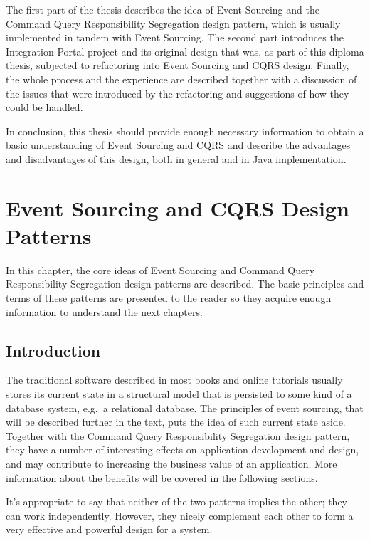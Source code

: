 \documentclass{book}
\begin{document}
The first part of the thesis describes the idea of Event Sourcing and
the Command Query Responsibility Segregation design pattern, which is
usually implemented in tandem with Event Sourcing. The second part
introduces the Integration Portal project and its original design that
was, as part of this diploma thesis, subjected to refactoring into Event
Sourcing and CQRS design. Finally, the whole process and the experience
are described together with a discussion of the issues that were
introduced by the refactoring and suggestions of how they could be
handled.

In conclusion, this thesis should provide enough necessary information
to obtain a basic understanding of Event Sourcing and CQRS and describe
the advantages and disadvantages of this design, both in general and in
Java implementation.


\section{Event Sourcing and CQRS Design
Patterns}\label{event-sourcing-and-cqrs-design-patterns}

In this chapter, the core ideas of Event Sourcing and Command Query
Responsibility Segregation design patterns are described. The basic
principles and terms of these patterns are presented to the reader so
they acquire enough information to understand the next chapters.

\subsection{Introduction}\label{introduction}

The traditional software described in most books and online tutorials
usually stores its current state in a structural model that is persisted
to some kind of a database system, e.g.~a relational database. The
principles of event sourcing, that will be described further in the
text, puts the idea of such current state aside. Together with the
Command Query Responsibility Segregation design pattern, they have a
number of interesting effects on application development and design, and
may contribute to increasing the business value of an application. More
information about the benefits will be covered in the following
sections.

It's appropriate to say that neither of the two patterns implies the
other; they can work independently. However, they nicely complement each
other to form a very effective and powerful design for a system.~\cite{journey}
\end{document}
